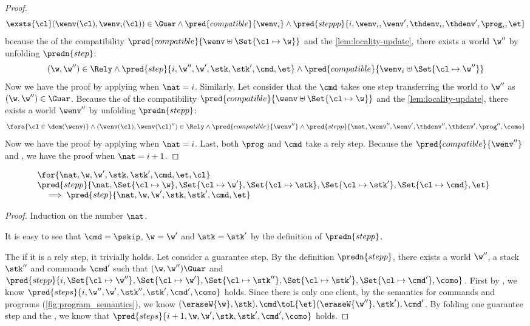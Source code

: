 \begin{proof}
\[
\exsts{\cl} (\wenv(\cl), \wenv_i(\cl)) \in \Guar \land  \pred{compatible}{\wenv_i} \land \pred{steppp}{i, \wenv_i, \wenv', \thdenv_i, \thdenv', \prog_i, \et}
\]
because the of the compatibility \( \pred{compatible}{\wenv \uplus \Set{\cl \mapsto \w}} \) and the \cref{lem:locality-update}, there exists a world \( \w''\) by unfolding \( \predn{step} \):
\[
    (\w, \w'') \in \Rely \land \pred{step}{i, \w'', \w', \stk, \stk', \cmd, \et}  \land \pred{compatible}{\wenv_i \uplus \Set{\cl \mapsto \w''}}
\]
Now we have the proof by applying \ih when \( \nat = i \).
Similarly, Let consider that the \( \cmd \) takes one step transferring the world to \( \w'' \) as \( (\w, \w'') \in \Guar \).
Because the of the compatibility \( \pred{compatible}{\wenv \uplus \Set{\cl \mapsto \w}} \) and the \cref{lem:locality-update}, there exists a world \( \wenv''\) by unfolding \( \predn{stepp} \):
\[
    \fora{\cl \in \dom(\wenv)} \land (\wenv(\cl), \wenv(\cl)'') \in \Rely \land \pred{compatible}{\wenv''} \land \pred{stepp}{ \nat, \wenv'', \wenv', \thdenv'', \thdenv',\prog'', \como} 
\]
Now we have the proof by applying \ih when \( \nat = i \).
Last, both \( \prog\) and \( \cmd \) take a rely step.
Because the \( \pred{compatible}{\wenv''} \) and \ih, we have the proof when \( \nat =  i + 1\).

\end{proof}


\begin{lemma}
\label{lem:prgram-step-to-command-step}
\[
\begin{array}{@{}l}
    \for{\nat, \w, \w', \stk, \stk', \cmd, \et, \cl} \\
    \pred{stepp}{\nat, \Set{\cl \mapsto \w},\Set{\cl \mapsto \w'}, \Set{\cl \mapsto \stk}, \Set{ \cl \mapsto \stk'}, \Set{\cl \mapsto \cmd}, \et}  \\
    \quad \implies \pred{step}{\nat, \w, \w', \stk, \stk', \cmd, \et} \\
\end{array}
\]
\end{lemma}
\begin{proof}
Induction on the number \( \nat \).

It is easy to see that \( \cmd = \pskip \), \( \w = \w'\) and \( \stk = \stk' \) by the definition of \(  \predn{stepp}\).


The if it is a rely step, it trivially holds.
Let consider a guarantee step.
By the definition \( \predn{stepp}\), there exists a world \( \w'' \), a stack \( \stk'' \) and commands \( \cmd' \) such that \( (\w, \w'') \Guar\) and
\( \pred{stepp}{ i, \Set{\cl \mapsto \w''},\Set{\cl \mapsto \w'}, \Set{\cl \mapsto \stk''}, \Set{ \cl \mapsto \stk'}, \Set{\cl \mapsto \cmd'}, \como}  \).
First by \ih, we know  \( \pred{steps}{ i, \w'', \w', \stk'', \stk', \cmd', \como} \) holds.
Since there is only one client, by the semantics for commands and programs (\cref{fig:program_semantics}), we know \( (\eraseW{\w}, \stk ), \cmd \toL{\et} (\eraseW{\w''}, \stk'), \cmd' \).
By folding one guarantee step and the \ih, we know that \( \pred{steps}{ i + 1, \w, \w', \stk, \stk', \cmd', \como} \) holds.
\end{proof}
